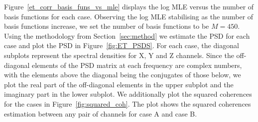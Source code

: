 \documentclass[%
 reprint,
 amsmath,amssymb,
 aps,
 nofootinbib,
]{revtex4-2}
\begin{document}
Figure~\ref{et_corr_basis_funs_vs_mle} displays the log MLE versus the number of basis functions for each case. 
Observing the log MLE stabilising as the number of basis functions increase, we set the number of basis functions to be $M=450$.
Using the methodology from Section~\ref{sec:method} we estimate the PSD for each case and plot the PSD in Figure~\ref{fig:ET_PSDS}. For each case, the diagonal subplots represent the spectral densities for X, Y and Z channels. Since the off-diagonal elements of the PSD matrix at each frequency are complex numbers, with the elements above the diagonal being the conjugates of those below, we plot the real part of the off-diagonal elements in the upper subplot and the imaginary part in the lower subplot.
We additionally plot the squared coherences for the cases in Figure~\ref{fig:squared_coh}. The plot shows the squared coherences estimation between any pair of channels for case A and case B.
\end{document}
